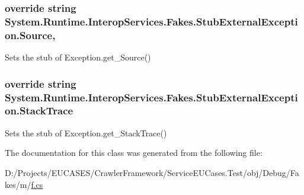 \hypertarget{class_system_1_1_runtime_1_1_interop_services_1_1_fakes_1_1_stub_external_exception_ac759ceb8de292faca7a54a7f5adc395d}{
\subsubsection[{Source}]{\setlength{\rightskip}{0pt plus 5cm}override string System.\-Runtime.\-Interop\-Services.\-Fakes.\-Stub\-External\-Exception.\-Source\hspace{0.3cm}{\ttfamily [get]}, {\ttfamily [set]}}}\label{class_system_1_1_runtime_1_1_interop_services_1_1_fakes_1_1_stub_external_exception_ac759ceb8de292faca7a54a7f5adc395d}


Sets the stub of Exception.\-get\-\_\-\-Source()

\hypertarget{class_system_1_1_runtime_1_1_interop_services_1_1_fakes_1_1_stub_external_exception_ac185a256b3fc8e2626ed9f1938b811d2}{
\subsubsection[{Stack\-Trace}]{\setlength{\rightskip}{0pt plus 5cm}override string System.\-Runtime.\-Interop\-Services.\-Fakes.\-Stub\-External\-Exception.\-Stack\-Trace\hspace{0.3cm}{\ttfamily [get]}}}\label{class_system_1_1_runtime_1_1_interop_services_1_1_fakes_1_1_stub_external_exception_ac185a256b3fc8e2626ed9f1938b811d2}


Sets the stub of Exception.\-get\-\_\-\-Stack\-Trace()



The documentation for this class was generated from the following file\-:\begin{DoxyCompactItemize}
\item 
D\-:/\-Projects/\-E\-U\-C\-A\-S\-E\-S/\-Crawler\-Framework/\-Service\-E\-U\-Cases.\-Test/obj/\-Debug/\-Fakes/m/\hyperlink{m_2f_8cs}{f.\-cs}\end{DoxyCompactItemize}
